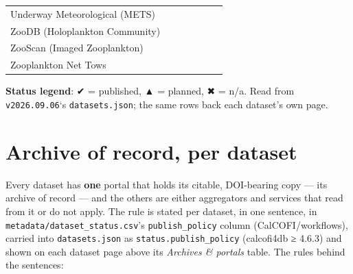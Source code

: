 \documentclass[
  letterpaper,
  DIV=11,
  numbers=noendperiod]{scrreprt}
\begin{document}
\begin{table}
{\begin{tabular*}{1\linewidth}{@{\extracolsep{\fill}}lcccccc}
Underway Meteorological (METS) & {\cellcolor[HTML]{CCFFCC}{\textcolor[HTML]{000000}{✔}}} & {\cellcolor[HTML]{FFCCCC}{\textcolor[HTML]{000000}{✖}}} & {\cellcolor[HTML]{FFF2CC}{\textcolor[HTML]{000000}{▲}}} & {\cellcolor[HTML]{FFF2CC}{\textcolor[HTML]{000000}{▲}}} & {\cellcolor[HTML]{FFF2CC}{\textcolor[HTML]{000000}{▲}}} & {\cellcolor[HTML]{CCFFCC}{\textcolor[HTML]{000000}{✔}}} \\ 
ZooDB (Holoplankton Community) & {\cellcolor[HTML]{CCFFCC}{\textcolor[HTML]{000000}{✔}}} & {\cellcolor[HTML]{FFCCCC}{\textcolor[HTML]{000000}{✖}}} & {\cellcolor[HTML]{FFF2CC}{\textcolor[HTML]{000000}{▲}}} & {\cellcolor[HTML]{FFCCCC}{\textcolor[HTML]{000000}{✖}}} & {\cellcolor[HTML]{FFF2CC}{\textcolor[HTML]{000000}{▲}}} & {\cellcolor[HTML]{CCFFCC}{\textcolor[HTML]{000000}{✔}}} \\ 
ZooScan (Imaged Zooplankton) & {\cellcolor[HTML]{CCFFCC}{\textcolor[HTML]{000000}{✔}}} & {\cellcolor[HTML]{FFCCCC}{\textcolor[HTML]{000000}{✖}}} & {\cellcolor[HTML]{FFF2CC}{\textcolor[HTML]{000000}{▲}}} & {\cellcolor[HTML]{FFCCCC}{\textcolor[HTML]{000000}{✖}}} & {\cellcolor[HTML]{FFF2CC}{\textcolor[HTML]{000000}{▲}}} & {\cellcolor[HTML]{CCFFCC}{\textcolor[HTML]{000000}{✔}}} \\ 
Zooplankton Net Tows & {\cellcolor[HTML]{CCFFCC}{\textcolor[HTML]{000000}{✔}}} & {\cellcolor[HTML]{FFCCCC}{\textcolor[HTML]{000000}{✖}}} & {\cellcolor[HTML]{FFF2CC}{\textcolor[HTML]{000000}{▲}}} & {\cellcolor[HTML]{FFCCCC}{\textcolor[HTML]{000000}{✖}}} & {\cellcolor[HTML]{FFF2CC}{\textcolor[HTML]{000000}{▲}}} & {\cellcolor[HTML]{CCFFCC}{\textcolor[HTML]{000000}{✔}}} \\ 
\bottomrule
\end{tabular*}
\begin{minipage}{\linewidth}
\vspace{.05em}
\textbf{Status legend}: ✔ = published, ▲ = planned, ✖ = n/a. Read from \texttt{v2026.09.06}`s \texttt{datasets.json}; the same rows back each dataset's own page.\\
\end{minipage}

}

\end{table}%

\section{Archive of record, per
dataset}\label{archive-of-record-per-dataset}

Every dataset has \textbf{one} portal that holds its citable,
DOI-bearing copy --- its archive of record --- and the others are either
aggregators and services that read from it or do not apply. The rule is
stated per dataset, in one sentence, in
\texttt{metadata/dataset\_status.csv}'s \texttt{publish\_policy} column
(CalCOFI/workflows), carried into \texttt{datasets.json} as
\texttt{status.publish\_policy} (calcofi4db ≥ 4.6.3) and shown on each
dataset page above its \emph{Archives \& portals} table. The rules
behind the sentences:
\end{document}

